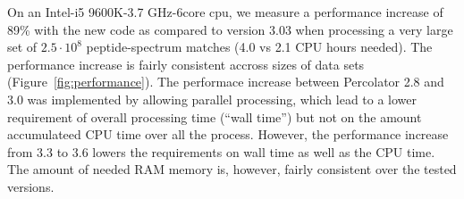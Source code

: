 \documentclass{article}
\begin{document}
On an Intel-i5 9600K-3.7 GHz-6core cpu, we measure a performance increase of 89\% with the new code as compared to version 3.03 when processing a very large set of $2.5\cdot10^8$ peptide-spectrum matches (4.0 vs 2.1 CPU hours needed).
The performance increase is fairly consistent accross sizes of data sets (Figure~\ref{fig:performance}).
The performace increase between Percolator 2.8 and 3.0 was implemented by allowing parallel processing, which lead to a lower requirement of overall processing time (``wall time'') but not on the amount accumulateed CPU time over all the process.
However, the performance increase from 3.3 to 3.6 lowers the requirements on wall time as well as the CPU time.  
The amount of needed RAM memory is, however, fairly consistent over the tested versions.


\end{document}
